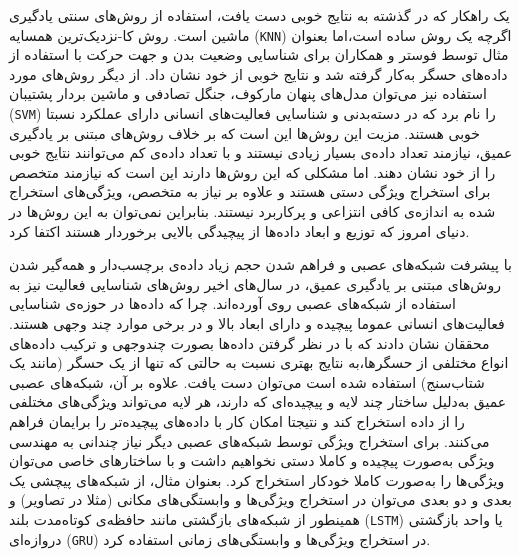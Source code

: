 یک راهکار که در گذشته به نتایج خوبی دست یافت، استفاده از روش‌های سنتی یادگیری ماشین است. روش
کا-نزدیک‌ترین همسایه (\verb|KNN|)
اگرچه یک روش ساده است،‌اما بعنوان مثال توسط
فوستر و همکاران\cite{foerster1999detection}
برای شناسایی وضعیت بدن و جهت حرکت با استفاده از داده‌های حسگر به‌کار گرفته شد و نتایج خوبی از خود نشان داد. از دیگر روش‌های مورد استفاده نیز می‌توان
مدل‌های پنهان مارکوف\cite{asghari2018activity}،
جنگل تصادفی\cite{attal2015physical}
و ماشین بردار پشتیبان (\verb|SVM|)\cite{attal2015physical}
را نام برد که در دسته‌بدنی و شناسایی فعالیت‌های انسانی دارای عملکرد نسبتا خوبی هستند. مزیت این روش‌ها این است که بر خلاف روش‌های مبتنی بر یادگیری عمیق،‌ نیازمند تعداد داده‌ی بسیار زیادی نیستند و با تعداد داده‌ی کم می‌توانند نتایج خوبی را از خود نشان دهند\cite{chen2021deep}.
اما مشکلی که این روش‌ها دارند این است که نیازمند متخصص برای
استخراج ویژگی دستی
هستند و علاوه بر نیاز به متخصص، ویژگی‌های استخراج شده به اندازه‌ی کافی
انتزاعی
و پرکاربرد نیستند. بنابراین نمی‌توان به این روش‌ها در دنیای امروز که توزیع و ابعاد داده‌ها از پیچیدگی بالایی برخوردار هستند اکتفا کرد.

با پیشرفت شبکه‌های عصبی و فراهم شدن حجم زیاد داده‌ی برچسب‌دار و همه‌گیر شدن روش‌های مبتنی بر یادگیری عمیق، در سال‌های اخیر روش‌های شناسایی فعالیت نیز به استفاده از شبکه‌های عصبی روی آورده‌اند. چرا که داده‌ها در حوزه‌ی شناسایی فعالیت‌های انسانی عموما پیچیده و دارای ابعاد بالا و در برخی موارد چند وجهی هستند. محققان نشان دادند که با در نظر گرفتن داده‌ها بصورت چندوجهی و ترکیب داده‌های انواع مختلفی از حسگرها،‌به نتایج بهتری نسبت به حالتی که تنها از یک حسگر (مانند یک شتاب‌سنج) استفاده شده است می‌توان دست یافت\cite{guo2016wearable}.
علاوه بر آن، شبکه‌های عصبی عمیق به‌دلیل ساختار چند لایه و پیچیده‌ای که دارند، هر لایه می‌تواند ویژگی‌های مختلفی را از داده استخراج کند و نتیجتا امکان کار با داده‌های پیچیده‌تر را برایمان فراهم می‌کنند. برای استخراج ویژگی توسط شبکه‌های عصبی دیگر نیاز چندانی به مهندسی ویژگی به‌صورت پیچیده و کاملا دستی نخواهیم داشت و با ساختارهای خاصی می‌توان ویژگی‌ها را به‌صورت کاملا خودکار استخراج کرد. بعنوان مثال، از شبکه‌های پیچشی یک بعدی و دو بعدی می‌توان در استخراج ویژگی‌ها و
وابستگی‌های مکانی
(مثلا در تصاویر)
و همینطور از شبکه‌های بازگشتی
مانند حافظه‌ی کوتاه‌مدت بلند (\verb|LSTM|)
یا واحد بازگشتی دروازه‌ای (\verb|GRU|)
در استخراج ویژگی‌ها و وابستگی‌های زمانی استفاده کرد.

